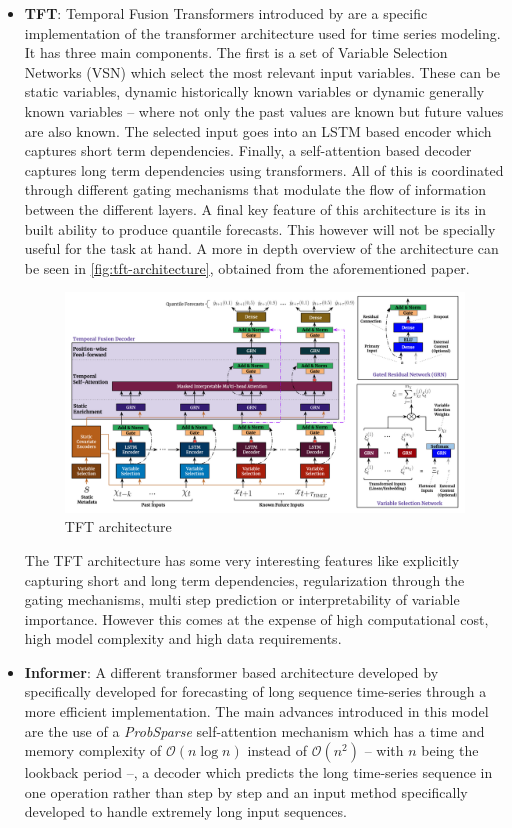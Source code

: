 \begin{itemize}
    \item \textbf{TFT}: Temporal Fusion Transformers introduced by \cite{lim_arık_loeff_pfister_2021} are a specific implementation of the transformer architecture used for time series modeling. It has three main components. The first is a set of Variable Selection Networks (VSN) which select the most relevant input variables. These can be static variables, dynamic historically known variables or dynamic generally known variables -- where not only the past values are known but future values are also known. The selected input goes into an LSTM based encoder which captures short term dependencies. Finally, a self-attention based decoder captures long term dependencies using transformers. All of this is coordinated through different gating mechanisms that modulate the flow of information between the different layers. A final key feature of this architecture is its in built ability to produce quantile forecasts. This however will not be specially useful for the task at hand. A more in depth overview of the architecture can be seen in \autoref{fig:tft-architecture}, obtained from the aforementioned paper. 
    \begin{figure}[ht]
        \centering
        \captionsetup{justification=centering}
        \includegraphics[width=\linewidth]{assets/tft-architecture.png}
        \caption{TFT architecture}
        \label{fig:tft-architecture}
    \end{figure}
    The TFT architecture has some very interesting features like explicitly capturing short and long term dependencies, regularization through the gating mechanisms, multi step prediction or interpretability of variable importance. However this comes at the expense of high computational cost, high model complexity and high data requirements.
    \item \textbf{Informer}: A different transformer based architecture developed by \cite{zhou_zhang_peng_zhang_li_xiong_zhang_2021} specifically developed for forecasting of long sequence time-series through a more efficient implementation. The main advances introduced in this model are the use of a \textit{ProbSparse} self-attention mechanism which has a time and memory complexity of $\mathcal{O}(n\log n)$ instead of $\mathcal{O}\left(n^2\right)$ -- with $n$ being the lookback period --, a decoder which predicts the long time-series sequence in one operation rather than step by step and an input method specifically developed to handle extremely long input sequences. 
    

\end{itemize}
